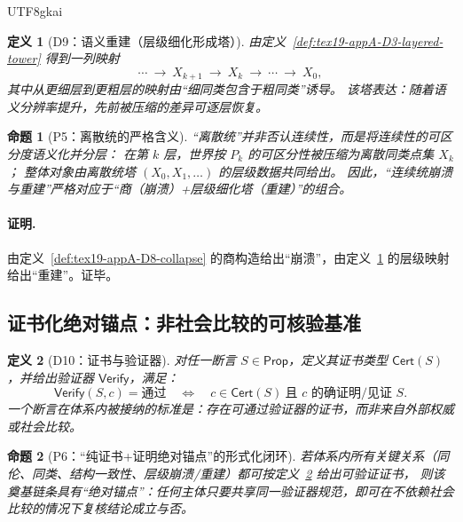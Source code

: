 \documentclass[12pt]{article}
\newtheorem{definition}{定义}[section]
\newtheorem{proposition}{命题}[section]
\begin{document}
\begin{CJK*}{UTF8}{gkai}
\begin{definition}[D9：语义重建（层级细化形成塔）]
\label{def:tex19-appA-D9-rebuild}
由定义~\ref{def:tex19-appA-D3-layered-tower} 得到一列映射
\[
\cdots\ \longrightarrow\ X_{k+1}\ \longrightarrow\ X_k\ \longrightarrow\ \cdots\ \longrightarrow\ X_0,
\]
其中从更细层到更粗层的映射由“细同类包含于粗同类”诱导。
该塔表达：随着语义分辨率提升，先前被压缩的差异可逐层恢复。
\end{definition}

\begin{proposition}[P5：离散统的严格含义]
\label{prop:tex19-appA-P5-discrete-meaning}
“离散统”并非否认连续性，而是将连续性的可区分度语义化并分层：
在第 $k$ 层，世界按 $P_k$ 的可区分性被压缩为离散同类点集 $X_k$；
整体对象由离散统塔 $(X_0,X_1,\dots)$ 的层级数据共同给出。
因此，“连续统崩溃与重建”严格对应于“商（崩溃）+层级细化塔（重建）”的组合。
\end{proposition}

\paragraph{证明.}
由定义~\ref{def:tex19-appA-D8-collapse} 的商构造给出“崩溃”，由定义~\ref{def:tex19-appA-D9-rebuild} 的层级映射给出“重建”。证毕。

\subsection{证书化绝对锚点：非社会比较的可核验基准}
\label{subsec:tex19-appA-certificate-anchor}

\begin{definition}[D10：证书与验证器]
\label{def:tex19-appA-D10-cert-verifier}
对任一断言 $S\in\mathsf{Prop}$，定义其证书类型 $\mathsf{Cert}(S)$，并给出验证器 $\mathsf{Verify}$，满足：
\[
\mathsf{Verify}(S,c)=\text{通过}
\quad\Longleftrightarrow\quad
c\in\mathsf{Cert}(S)\ \text{且 $c$ 的确证明/见证 $S$}.
\]
一个断言在体系内被接纳的标准是：存在可通过验证器的证书，而非来自外部权威或社会比较。
\end{definition}

\begin{proposition}[P6：“纯证书+证明绝对锚点”的形式化闭环]
\label{prop:tex19-appA-P6-anchor}
若体系内所有关键关系（同伦、同类、结构一致性、层级崩溃/重建）都可按定义~\ref{def:tex19-appA-D10-cert-verifier} 给出可验证证书，
则该奠基链条具有“绝对锚点”：任何主体只要共享同一验证器规范，即可在不依赖社会比较的情况下复核结论成立与否。
\end{proposition}


\end{CJK*}
\end{document}
